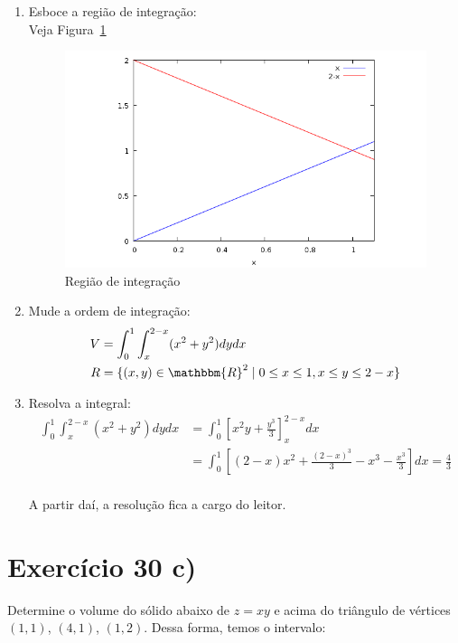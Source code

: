 \documentclass{article}
\theoremstyle{definition}
\begin{document}
        \begin{enumerate}
            \item Esboce a região de integração:\\
                Veja Figura~\ref{fig:retas-37}
                \begin{figure}[h!]
                    \includegraphics[width=\linewidth]{retas-37.png}
                    \caption{Região de integração}
                    \label{fig:retas-37}
                \end{figure}

            \item Mude a ordem de integração:
                \begin{align*}
                    V &= \int_0^1 \int_x^{2 - x} (x^2 + y^2) dy dx\\
                    R &= \{ (x, y) \in \mathbbm{R}^2 \mid 0 \leq x \leq 1, x \leq y \leq 2 -x \}
                \end{align*}

            \item Resolva a integral:
                \begin{align*}
                    \int_0^1 \int_x^{2 - x} (x^2 + y^2) dy dx &= \int_0^1 \left[ x^2y + \frac{y^3}{3} \right]_x^{2-x} dx\\
                    &= \int_0^1 \left[(2-x)x^2 + \frac{(2-x)^3}{3} - x^3 - \frac{x^3}{3} \right] dx = \frac{4}{3}\\
                \end{align*}

                A partir daí, a resolução fica a cargo do leitor.
        \end{enumerate}

    \section{Exercício 30 c)}
        Determine o volume do sólido abaixo de $z = xy$ e acima do triângulo de vértices $(1, 1)$, $(4, 1)$, $(1, 2)$.
        Dessa forma, temos o intervalo:
\end{document}
